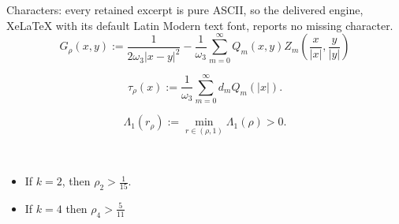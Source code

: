 \documentclass[10pt,a4paper]{amsart}
\begin{document}
Characters: every retained excerpt is pure ASCII, so the delivered engine, XeLaTeX with its default Latin Modern text font, reports no missing character.
\begin{equation}\label{Greenanello}
G_\rho(x, y):=\frac{1}{2\omega_3|x-y|^2}-\frac{1}{\omega_3}\sum_{m=0}^{\infty} Q_m(x, y) Z_m\left(\frac{x}{|x|}, \frac{y}{|y|}\right)\end{equation}

\begin{equation}\label{robinanello}
\tau_{\rho}(x):=\frac{1}{\omega_3}\sum_{m=0}^{\infty}d_mQ_m(|x|).\end{equation}

\begin{equation}\label{c1}\Lambda_1(r_\rho):=\min\limits_{r\in(\rho,1)}\Lambda_1(\rho)>0.\end{equation}

\begin{proposition}\label{thmanello} ${}$
\begin{itemize}
\item If $k=2$, then $\rho_2>\frac{1}{15}$.
\item If $k=4$  then  $\rho_4>\frac{5}{11}$
\end{itemize}\end{proposition}
\end{document}

